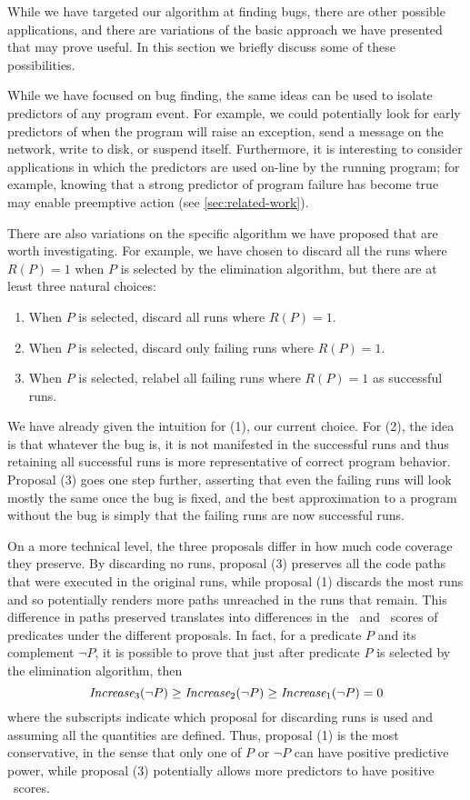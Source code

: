 While we have targeted our algorithm at finding bugs, there are other
possible applications, and there are variations of the basic approach
we have presented that may prove useful.  In this section we briefly
discuss some of these possibilities.

While we have focused on bug finding, the same ideas
can be used to isolate predictors of any program event.  For example,
we could potentially look for early predictors of when the program
will raise an exception, send a message on the network, write to disk,
or suspend itself.  Furthermore, it is interesting to consider
applications in which the predictors are used on-line by the running
program; for example, knowing that a strong predictor of program
failure has become true may enable preemptive action (see
\autoref{sec:related-work}).

There are also variations on the specific algorithm we have proposed
that are worth investigating.  For example, we have chosen to discard
all the runs where $R(P) = 1$ when $P$ is selected by the
elimination algorithm, but there are at least three natural choices:
\begin{enumerate}
\item When $P$ is selected, discard all runs where $R(P) = 1$.

\item When $P$ is selected, discard only failing runs where $R(P) = 1$.

\item When $P$ is selected, relabel all failing runs where $R(P) = 1$ as successful runs.
\end{enumerate}

We have already given the intuition for (1), our current choice.  For
(2), the idea is that whatever the bug is, it is not manifested in the
successful runs and thus retaining all successful runs is more
representative of correct program behavior.  Proposal (3) goes one step
further, asserting that even the failing runs will look mostly the same
once the bug is fixed, and the best approximation to a program without the
bug is simply that the failing runs are now successful runs.

On a more technical level, the three proposals differ in how much code
coverage they preserve.  By discarding no runs, proposal (3) preserves
all the code paths that were executed in the original
runs, while proposal (1) discards the most runs and so
potentially renders more paths unreached in the runs that
remain.  This difference in paths preserved translates into differences
in the \crash\ and \context\ scores of predicates under the different proposals.
In fact, for a predicate $P$ and its complement $\neg P$, it is
possible to prove that just after predicate $P$ is selected by the
elimination algorithm, then 
\[ \textit{Increase}_3(\neg P) \geq \textit{Increase}_2(\neg P) \geq \textit{Increase}_1(\neg P) = 0 \]
where the subscripts indicate which proposal for discarding runs is used
and assuming all the quantities are defined.  Thus, proposal (1) is the
most conservative, in the sense that only one of $P$ or $\neg P$ can
have positive predictive power, while proposal (3) potentially allows
more predictors to have positive \increase\ scores.  

